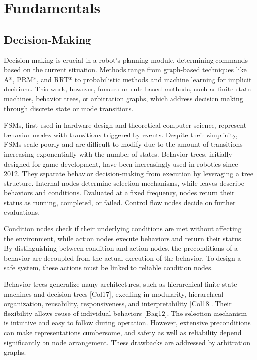 
\section{Fundamentals}


\subsection{Decision-Making}

Decision-making is crucial in a robot's planning module, determining commands based on the current situation.
Methods range from graph-based techniques like A*, PRM*, and RRT* to probabilistic methods and machine learning for implicit decisions.
This work, however, focuses on rule-based methods, such as finite state machines, behavior trees, or arbitration graphs, which address decision making through discrete state or mode transitions.

\glspl{FSM}, first used in hardware design and theoretical computer science, represent behavior modes with transitions triggered by events.
Despite their simplicity, \glspl{FSM} scale poorly and are difficult to modify due to the amount of transitions increasing exponentially with the number of states.
Behavior trees, initially designed for game development, have been increasingly used in robotics since 2012.
They separate behavior decision-making from execution by leveraging a tree structure.
Internal nodes determine selection mechanisms, while leaves describe behaviors and conditions.
Evaluated at a fixed frequency, nodes return their status as running, completed, or failed.
Control flow nodes decide on further evaluations.

Condition nodes check if their underlying conditions are met without affecting the environment, while action nodes execute behaviors and return their status.
By distinguishing between condition and action nodes, the preconditions of a behavior  are decoupled from the actual execution of the behavior.
To design a safe system, these actions must be linked to reliable condition nodes.

Behavior trees generalize many architectures, such as hierarchical finite state machines and decision trees [Col17], excelling in modularity, hierarchical organization, reusability, responsiveness, and interpretability [Col18].
Their flexibility allows reuse of individual behaviors [Bag12].
The selection mechanism is intuitive and easy to follow during operation.
However, extensive preconditions can make representations cumbersome, and safety as well as reliability depend significantly on node arrangement.
These drawbacks are addressed by arbitration graphs.

